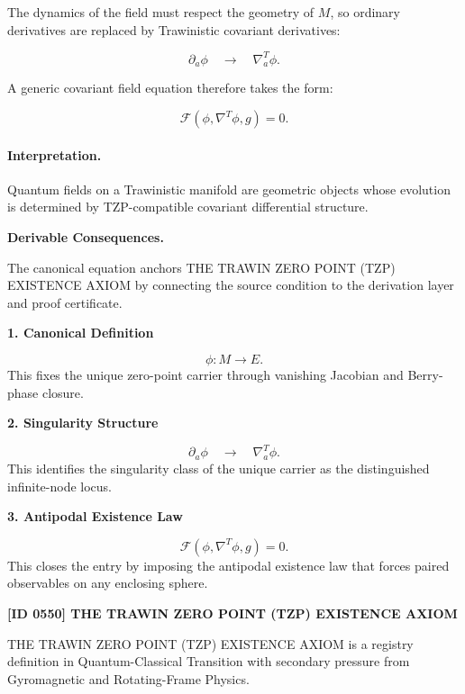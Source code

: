 The dynamics of the field must respect the geometry of $M$, so ordinary derivatives are replaced by Trawinistic covariant derivatives:

\begin{equation}
\partial_a\phi
\quad\longrightarrow\quad
\nabla^T_a\phi .
\end{equation}

A generic covariant field equation therefore takes the form:

\begin{equation}
\mathcal{F}
\left(
\phi,\nabla^T\phi,g
\right)
=
0 .
\end{equation}

\paragraph{Interpretation.}
Quantum fields on a Trawinistic manifold are geometric objects whose evolution is determined by TZP-compatible covariant differential structure.

\par\vspace{0.35em}
\noindent\textbf{Derivable Consequences.}\quad
\begingroup
\footnotesize
\raggedright
The canonical equation anchors THE TRAWIN ZERO POINT (TZP) EXISTENCE AXIOM by connecting the source condition to the derivation layer and proof certificate.
\par\endgroup

\noindent\textbf{1. Canonical Definition}\par
\[
\phi:M\to E.
\]
\noindent This fixes the unique zero-point carrier through vanishing Jacobian and Berry-phase closure.\par
\noindent\textbf{2. Singularity Structure}\par
\[
\partial_a\phi \quad\longrightarrow\quad \nabla^T_a\phi.
\]
\noindent This identifies the singularity class of the unique carrier as the distinguished infinite-node locus.\par
\noindent\textbf{3. Antipodal Existence Law}\par
\[
\mathcal{F} \left( \phi,\nabla^T\phi,g \right) = 0.
\]
\noindent This closes the entry by imposing the antipodal existence law that forces paired observables on any enclosing sphere.\par

\clearpage
\noindent\textbf{[ID 0550] THE TRAWIN ZERO POINT (TZP) EXISTENCE AXIOM}\par
\vspace{0.35em}
\begingroup\small
{}
THE TRAWIN ZERO POINT (TZP) EXISTENCE AXIOM is a registry definition in Quantum-Classical Transition with secondary pressure from Gyromagnetic and Rotating-Frame Physics.


